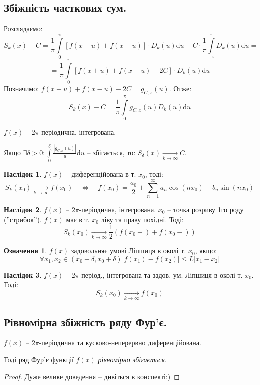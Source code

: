 \documentclass[a4paper]{scrartcl}
\theoremstyle{definition}
\newtheorem*{defo}{Означення}
\theoremstyle{remark}
\theoremstyle{definition}
\newtheorem*{consequence}{Наслідок}
\theoremstyle{definition}
\begin{document}
\subsection{Збіжність часткових сум.}
Розглядаємо:
$$
S_k(x) - C = \frac{1}{\pi}  \int\limits_{0}^{\pi}{ \left[ f(x+u) + f(x-u) \right]\cdot D_k(u) \mathrm{d} u } - C \cdot \frac{1}{\pi}  \int\limits_{-\pi}^{\pi}{D_k(u)\mathrm{d} u} =
$$
$$
= \frac{1}{\pi}  \int\limits_{0}^{\pi}{ \left[ f(x+u) + f(x-u) - 2C \right]\cdot D_k(u) \mathrm{d} u }
$$
Позначимо: $f(x+u) + f(x-u) - 2C  = g_{C, x}(u)$. Отже:
$$
S_k(x) - C = \frac{1}{\pi}  \int\limits_{0}^{\pi}{
g_{C, x}(u) D_k(u) \mathrm{d} u
}
$$
\begin{boxteo}
$
f(x)
$ -- $2\pi$-періодична, інтегрована.\par
Якщо $\exists \delta >0 :  \int\limits_{0}^{\delta}{
\frac{ \left| g_{C,x} (u) \right|}{u} \mathrm{d} u
} $ -- збігається, то:
$
S_{\delta}(x) \xrightarrow[k\to\infty]{}C
$.
\end{boxteo}
\begin{consequence}
  $f(x)$ -- диференційована в т. $x_0$, тоді:
  $$
  S_k(x_0) \xrightarrow[k\to \infty]{} f(x_0) \quad \Longleftrightarrow \quad f(x_0) = \frac{a_0}{2} +  \sum\limits_{n = 1}^{ \infty}{
  a_n \cos{(nx_0)} + b_n \sin{(nx_0)}
  }
  $$
\end{consequence}
\begin{consequence}
$
f(x)
$ -- $2\pi$-періодична, інтегрована. $x_0$ -- точка розриву 1го роду (''стрибок''). $f(x)$ має в т. $x_0$ ліву та праву похідні. Тоді:
$$
S_k (x_0) \xrightarrow[k\to \infty]{} \frac{1}{2}  \left( f(x_0+) + f(x_0-) \right)
$$
\end{consequence}
\begin{defo}
 $f(x)$ задовольняє умові Ліпшиця в околі т. $x_0$, якщо:
 $$
 \forall x_1, x_2 \in (x_0 - \delta, x_0 + \delta) \left| f(x_1) - f(x_2) \right| \leq L \left| x_1 - x_2 \right|
 $$
\end{defo}
\begin{consequence}
$
f(x)
$ -- $2\pi$-період., інтегрована та задов. ум. Ліпшиця в околі т. $x_0$. Тоді:
$$
S_k (x_0) \xrightarrow[k\to \infty]{} f(x_0)
$$
\end{consequence}
\newpage
\subsection{Рівномірна збіжність ряду Фур'є.}
\begin{boxteo}
$
f(x)
$ -- $2\pi$-періодична та кусково-неперервно диференційована.\par
Тоді ряд Фур'є функції $f(x)$ \textit{рівномірно збігається}.
\end{boxteo}
\begin{proof}
 Дуже велике доведення -- дивіться в конспекті:)
\end{proof}
\end{document}
